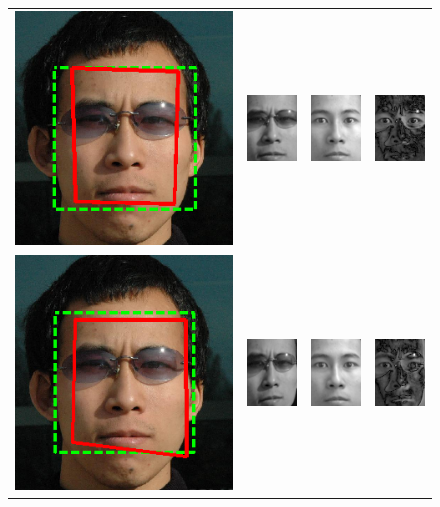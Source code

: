\documentclass[10pt,journal,letterpaper,compsoc]{IEEEtran} %
\begin{document}
\begin{figure}
\centering
{\small
\begin{tabular}{cccc}
\includegraphics[height=.8in]{figures_cvpr/L1_cropped} &
\includegraphics[height=.8in]{figures_cvpr/y_warp_L1} &
\includegraphics[height=.8in]{figures_cvpr/y_hat_L1} &
\includegraphics[height=.8in]{figures_cvpr/e_L1} \\
\includegraphics[height=.8in]{figures_cvpr/L2_cropped} &
\includegraphics[height=.8in]{figures_cvpr/y_warp_L2} &
\includegraphics[height=.8in]{figures_cvpr/y_hat_L2} &
\includegraphics[height=.8in]{figures_cvpr/e_L2} \\

\end{tabular}}
\end{figure}
\end{document}
